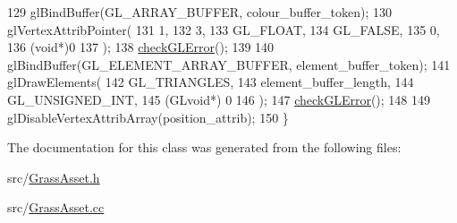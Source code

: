 \begin{DoxyCode}
129   glBindBuffer(GL\_ARRAY\_BUFFER, colour\_buffer\_token);
130   glVertexAttribPointer(
131     1,        
132     3,        
133     GL\_FLOAT,   
134     GL\_FALSE,   
135     0,        
136     (\textcolor{keywordtype}{void}*)0    
137   );
138   \hyperlink{GrassAsset_8cc_a75f201b0e53e68726854997957322b8d}{checkGLError}();
139 
140   glBindBuffer(GL\_ELEMENT\_ARRAY\_BUFFER, element\_buffer\_token);
141   glDrawElements(
142     GL\_TRIANGLES,
143     element\_buffer\_length,
144     GL\_UNSIGNED\_INT,
145     (GLvoid*) 0
146   );
147   \hyperlink{GrassAsset_8cc_a75f201b0e53e68726854997957322b8d}{checkGLError}();
148 
149   glDisableVertexAttribArray(position\_attrib);
150 \}
\end{DoxyCode}


The documentation for this class was generated from the following files\+:\begin{DoxyCompactItemize}
\item 
src/\hyperlink{GrassAsset_8h}{Grass\+Asset.\+h}\item 
src/\hyperlink{GrassAsset_8cc}{Grass\+Asset.\+cc}\end{DoxyCompactItemize}
